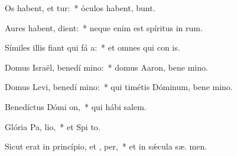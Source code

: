 \item Os habent, et  tur:~* óculos habent,   bunt.
\item Aures habent,   dient:~* neque enim est spíritus in  rum.
\item Símiles illis fiant qui fá a:~* et omnes qui con  is.
\item Domus Israël, benedí mino:~* domus Aaron, bene mino.
\item Domus Levi, benedí mino:~* qui timétis Dóminum, bene mino.
\item Benedíctus Dómi  on,~* qui hábi  salem.
\item Glória Pa,  lio,~* et Spi to.
\item Sicut erat in princípio, et ,  per,~* et in sǽcula sæ. men.
